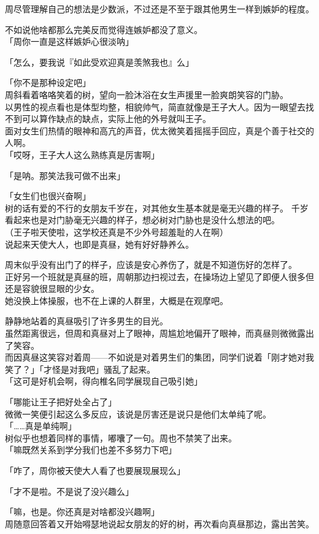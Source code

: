 周尽管理解自己的想法是少数派，不过还是不至于跟其他男生一样到嫉妒的程度。

不如说他啥都那么完美反而觉得连嫉妒都没了意义。\\

「周你一直是这样嫉妒心很淡呐」

「怎么，要我说『如此受欢迎真是羡煞我也』么」

「你不是那种设定吧」\\

周斜看着咯咯笑着的树，望向一脸沐浴在女生声援里一脸爽朗笑容的门胁。\\

以男性的视点看也是体型均整，相貌帅气，简直就像是王子大人。因为一眼望去找不到可以算作缺点的缺点，实际上他的外号就叫王子。\\

面对女生们热情的眼神和高亢的声音，优太微笑着摇摇手回应，真是个善于社交的人啊。\\

「哎呀，王子大人这么熟练真是厉害啊」

「是呐。那笑法我可做不出来」

「女生们也很兴奋啊」\\

树的话有爱的不行的女朋友千岁在，对其他女生基本就是毫无兴趣的样子。
千岁看起来也是对门胁毫无兴趣的样子，想必树对门胁也是没什么想法的吧。\\

（王子啦天使啦，这学校还真是不少外号超羞耻的人在啊）\\

说起来天使大人，也即是真昼，她有好好静养么。

周末似乎没有出门了的样子，应该是安心养伤了，就是不知道伤好的怎样了。\\

正好另一个班就是真昼的班，周朝那边扫视过去，在操场边上望见了即便人很多但还是容貌很显眼的少女。\\

她没换上体操服，也不在上课的人群里，大概是在观摩吧。

静静地站着的真昼吸引了许多男生的目光。\\

虽然距离很远，但周和真昼对上了眼神，周尴尬地偏开了眼神，而真昼则微微露出了笑容。\\

而因真昼这笑容对着周——不如说是对着男生们的集团，同学们说着「刚才她对我笑了？」「才怪是对我吧」骚乱了起来。\\

「这可是好机会啊，得向椎名同学展现自己吸引她」

「哪能让王子把好处全占了」\\

微微一笑便引起这么多反应，该说是厉害还是说只是他们太单纯了呢。\\

「……真是单纯啊」\\

树似乎也想着同样的事情，嘟囔了一句。周也不禁笑了出来。\\

「嘛既然关系到学分我们也差不多努力下吧」

「咋了，周你被天使大人看了也要展现展现么」

「才不是啦。不是说了没兴趣么」

「嘛，也是。你还真是对啥都没兴趣啊」\\

周随意回答着又开始嘚瑟地说起女朋友的好的树，再次看向真昼那边，露出苦笑。

